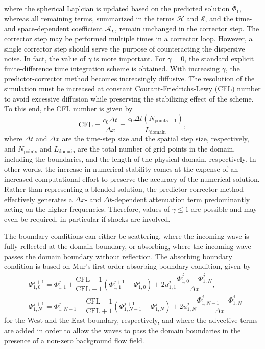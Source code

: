 where the spherical Laplcian is updated based on the predicted solution $\widetilde{\Phi}_1$, whereas all remaining terms, summarized in the terms $\mathcal{H}$ and $\mathcal{S}$, and the time- and space-dependent coefficient $\mathcal{A}_L$, remain unchanged in the corrector step. The corrector step may be performed multiple times in a corrector loop. However, a single corrector step should serve the purpose of counteracting the dispersive noise. In fact, the value of $\gamma$ is more important. For $\gamma=0$, the standard explicit finite-difference time integration scheme is obtained. With increasing $\gamma$, the predictor-corrector method becomes increasingly diffusive. The resolution of the simulation must be increased at constant Courant-Friedrichs-Lewy (CFL) number to avoid excessive diffusion while preserving the stabilizing effect of the scheme. To this end, the CFL number is given by
\begin{equation}
\mathrm{CFL} = \dfrac{c_0\Delta t}{\Delta x} = \dfrac{c_0\Delta t\left(N_{\mathrm{points}-1}\right)}{L_{\mathrm{domain}}},
\label{eq:CFL}
\end{equation}
where $\Delta t$ and $\Delta x$ are the time-step size and the spatial step size, respectively, and $N_{\mathrm{points}}$ and $L_{\mathrm{domain}}$ are the total number of grid points in the domain, including the boundaries, and the length of the physical domain, respectively. In other words, the increase in numerical stability comes at the expense of an increased computational effort to preserve the accuracy of the numerical solution. Rather than representing a blended solution, the predictor-corrector method effectively generates a $\Delta x$- and $\Delta t$-dependent attenuation term \citep{Nascimento_et_al_2010} predominantly acting on the higher frequencies. Therefore, values of $\gamma \le 1$ are possible and may even be required, in particular if shocks are involved. 

The boundary conditions can either be scattering, where the incoming wave is fully reflected at the domain boundary, or absorbing, where the incoming wave passes the domain boundary without reflection. The absorbing boundary condition is based on Mur's first-order absorbing boundary condition, given by \citep{Mur_1981}
\begin{align}
& \Phi_{1,0}^{j+1} = \Phi_{1,1}^{j} + \dfrac{\mathrm{CFL-1}}{\mathrm{CFL}+1}\left(\Phi_{1,1}^{j+1}-\Phi_{1,0}^{j}\right)
+ 2u_{1,1}^{j}\dfrac{\Phi_{1,0}^{j} - \Phi_{1,N}^{j}}{\Delta x},
\label{eq:Mur_West} \\[4pt]
& \Phi_{1,N}^{j+1} = \Phi_{1,N-1}^{j} + \dfrac{\mathrm{CFL-1}}{\mathrm{CFL}+1}\left(\Phi_{1,N-1}^{j+1}-\Phi_{1,N}^{j}\right)
+ 2u_{1,N}^{j}\dfrac{\Phi_{1,N-1}^{j} - \Phi_{1,N}^{j}}{\Delta x}
\label{eq:Mur_East}
\end{align}
for the West and the East boundary, respectively, and where the advective terms are added in order to allow the waves to pass the domain boundaries in the presence of a non-zero background flow field.

